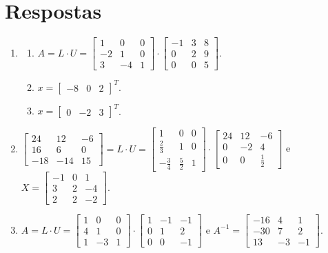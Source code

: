 \documentclass[12pt,a4paper]{article}
\begin{document}
\section*{Respostas}
\begin{enumerate}
\item
\begin{enumerate}
\item $A = L \cdot U =
\begin{bmatrix}
 1 &  0 & 0 \\
-2 &  1 & 0 \\
 3 & -4 & 1
\end{bmatrix}
\cdot
\begin{bmatrix}
-1 & 3 & 8 \\
 0 & 2 & 9 \\
 0 & 0 & 5
\end{bmatrix}
$.

\item
$ x = \begin{bmatrix}
-8 & 0 & 2
\end{bmatrix}^T$.
\item
$ x = \begin{bmatrix}
0 & -2 & 3
\end{bmatrix}^T$.
\end{enumerate}

\item $\begin{bmatrix}
 24 &  12 & -6\\
 16 &   6 &  0\\
-18 & -14 & 15
\end{bmatrix}
=L \cdot U = 
\begin{bmatrix}
1&0&0\\
\frac{2}{3}&1&0\\
-\frac{3}{4}&\frac{5}{2}&1
\end{bmatrix}
\cdot
\begin{bmatrix}
24&12&-6\\
0&-2&4\\
0&0&\frac{1}{2}
\end{bmatrix}$
e
$X = \begin{bmatrix}
-1&0&1\\
3&2&-4\\
2&2&-2
\end{bmatrix}$.

\item $A = L \cdot U = 
\begin{bmatrix}
1&0&0\\4&1&0\\1&-3&1
\end{bmatrix}
\cdot
\begin{bmatrix}
1&-1&-1\\0&1&2\\0&0&-1
\end{bmatrix}$
e
$A^{-1} = \begin{bmatrix}
-16&4&1\\
-30&7&2\\
13&-3&-1
\end{bmatrix}$.


\end{enumerate}
\end{document}
